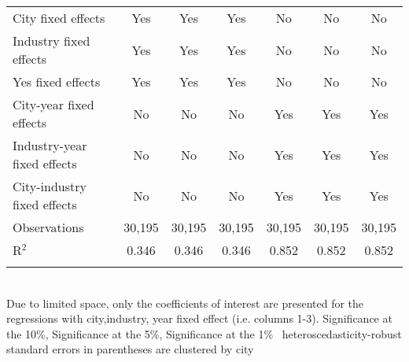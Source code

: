 \documentclass[12pt]{article}
\begin{document}
\begin{table}[!htbp]
\begin{adjustbox}{width=\textwidth, totalheight=\baselineskip,keepaspectratio}
\begin{tabular}{@{\extracolsep{5pt}}lcccccc}
City fixed effects & Yes & Yes & Yes & No & No & No \\ 
Industry fixed effects & Yes & Yes & Yes & No & No & No \\ 
Yes fixed effects & Yes & Yes & Yes & No & No & No \\ 
City-year fixed effects & No & No & No & Yes & Yes & Yes \\ 
Industry-year fixed effects & No & No & No & Yes & Yes & Yes \\ 
City-industry fixed effects & No & No & No & Yes & Yes & Yes \\ 
Observations & 30,195 & 30,195 & 30,195 & 30,195 & 30,195 & 30,195 \\ 
R$^{2}$ & 0.346 & 0.346 & 0.346 & 0.852 & 0.852 & 0.852 \\ 
\hline 
\hline \\[-1.8ex] 
\end{tabular}
\end{adjustbox}
\begin{tablenotes} 
 \small 
 \item \\ 
\footnotesize{
Due to limited space, only the coefficients of interest are presented 
for the regressions with city,industry, year fixed effect (i.e. columns 1-3).
\sym{*} Significance at the 10\%, \sym{**} Significance at the 5\%, \sym{***} Significance at the 1\% \
heteroscedasticity-robust standard errors in parentheses are clustered by city 
}
 
\end{tablenotes}
\end{table}
\end{document}
